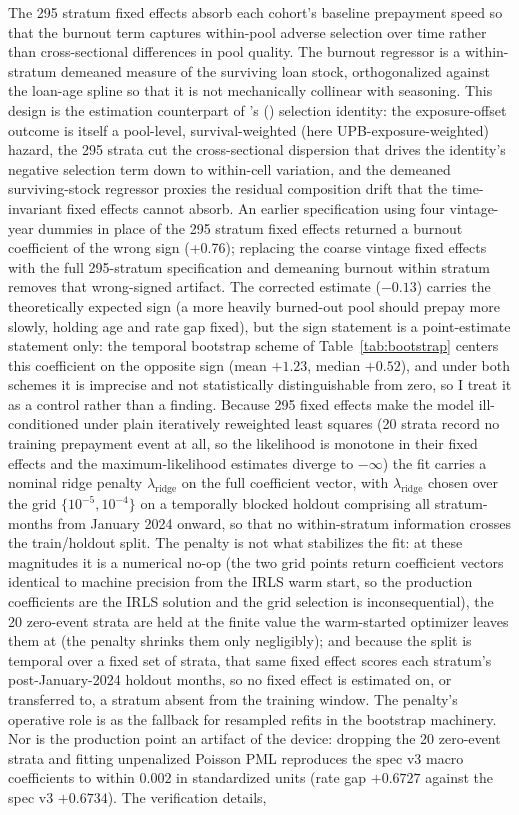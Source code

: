 \documentclass[12pt]{article}
\newcommand{\citepos}[1]{\citeauthor{#1}'s (\citeyear{#1})}
\begin{document}
The 295 stratum fixed effects absorb each cohort's baseline prepayment speed so that the burnout term captures within-pool adverse selection over time rather than cross-sectional differences in pool quality. The burnout regressor is a within-stratum demeaned measure of the surviving loan stock, orthogonalized against the loan-age spline so that it is not mechanically collinear with seasoning. This design is the estimation counterpart of \citepos{lesniewski2026} selection identity: the exposure-offset outcome is itself a pool-level, survival-weighted (here UPB-exposure-weighted) hazard, the 295 strata cut the cross-sectional dispersion that drives the identity's negative selection term down to within-cell variation, and the demeaned surviving-stock regressor proxies the residual composition drift that the time-invariant fixed effects cannot absorb. An earlier specification using four vintage-year dummies in place of the 295 stratum fixed effects returned a burnout coefficient of the wrong sign (+0.76); replacing the coarse vintage fixed effects with the full 295-stratum specification and demeaning burnout within stratum removes that wrong-signed artifact. The corrected estimate ($-0.13$) carries the theoretically expected sign (a more heavily burned-out pool should prepay more slowly, holding age and rate gap fixed), but the sign statement is a point-estimate statement only: the temporal bootstrap scheme of Table~\ref{tab:bootstrap} centers this coefficient on the opposite sign (mean $+1.23$, median $+0.52$), and under both schemes it is imprecise and not statistically distinguishable from zero, so I treat it as a control rather than a finding. Because 295 fixed effects make the model ill-conditioned under plain iteratively reweighted least squares (20 strata record no training prepayment event at all, so the likelihood is monotone in their fixed effects and the maximum-likelihood estimates diverge to $-\infty$) the fit carries a nominal ridge penalty $\lambda_{\mathrm{ridge}}$ on the full coefficient vector, with $\lambda_{\mathrm{ridge}}$ chosen over the grid $\{10^{-5}, 10^{-4}\}$ on a temporally blocked holdout comprising all stratum-months from January 2024 onward, so that no within-stratum information crosses the train/holdout split. The penalty is not what stabilizes the fit: at these magnitudes it is a numerical no-op (the two grid points return coefficient vectors identical to machine precision from the IRLS warm start, so the production coefficients are the IRLS solution and the grid selection is inconsequential), the 20 zero-event strata are held at the finite value the warm-started optimizer leaves them at (the penalty shrinks them only negligibly); and because the split is temporal over a fixed set of strata, that same fixed effect scores each stratum's post-January-2024 holdout months, so no fixed effect is estimated on, or transferred to, a stratum absent from the training window. The penalty's operative role is as the fallback for resampled refits in the bootstrap machinery. Nor is the production point an artifact of the device: dropping the 20 zero-event strata and fitting unpenalized Poisson PML reproduces the spec v3 macro coefficients to within $0.002$ in standardized units (rate gap $+0.6727$ against the spec v3 $+0.6734$). The verification details, 
\end{document}
